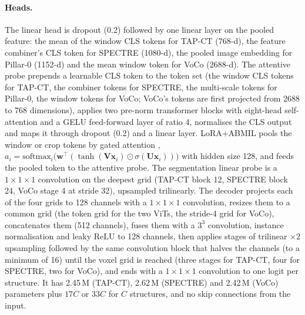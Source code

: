 \paragraph{Heads.} The linear head is dropout (0.2) followed by one linear layer on the pooled feature: the mean of the window CLS tokens for TAP-CT (768-d), the feature combiner's CLS token for SPECTRE (1080-d), the pooled image embedding for Pillar-0 (1152-d) and the mean window token for VoCo (2688-d). The attentive probe prepends a learnable CLS token to the token set (the window CLS tokens for TAP-CT, the combiner tokens for SPECTRE, the multi-scale tokens for Pillar-0, the window tokens for VoCo; VoCo's tokens are first projected from 2688 to 768 dimensions), applies two pre-norm transformer blocks with eight-head self-attention and a GELU feed-forward layer of ratio 4, normalises the CLS output and maps it through dropout (0.2) and a linear layer. LoRA+ABMIL pools the window or crop tokens by gated attention \citep{ilse2018abmil}, $a_i=\mathrm{softmax}_i\big(\bm{w}^\top(\tanh(\bm{V}\bm{x}_i)\odot\sigma(\bm{U}\bm{x}_i))\big)$ with hidden size 128, and feeds the pooled token to the attentive probe. The segmentation linear probe is a $1\times1\times1$ convolution on the deepest grid (TAP-CT block 12, SPECTRE block 24, VoCo stage 4 at stride 32), upsampled trilinearly. The decoder projects each of the four grids to 128 channels with a $1\times1\times1$ convolution, resizes them to a common grid (the token grid for the two ViTs, the stride-4 grid for VoCo), concatenates them (512 channels), fuses them with a $3^3$ convolution, instance normalisation and leaky ReLU to 128 channels, then applies stages of trilinear $\times2$ upsampling followed by the same convolution block that halves the channels (to a minimum of 16) until the voxel grid is reached (three stages for TAP-CT, four for SPECTRE, two for VoCo), and ends with a $1\times1\times1$ convolution to one logit per structure. It has 2.45\,M (TAP-CT), 2.62\,M (SPECTRE) and 2.42\,M (VoCo) parameters plus $17C$ or $33C$ for $C$ structures, and no skip connections from the input.

